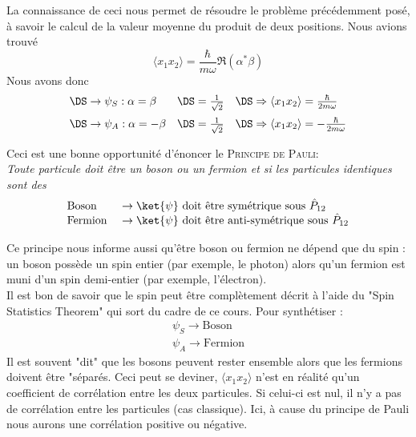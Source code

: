 La connaissance de ceci nous permet de résoudre le problème précédemment posé, à savoir le calcul 
de la valeur moyenne du produit de deux positions. Nous avions trouvé
\begin{equation}
\langle x_1x_2\rangle = \frac{\hbar}{m\omega}\Re(\alpha^*\beta)
\end{equation}
Nous avons donc
\begin{equation}
\begin{array}{lll}
\DS\to \psi_S : \alpha = \beta &\DS= \frac{1}{\sqrt{2}} &\DS\Rightarrow \langle x_1x_2\rangle = \frac{\hbar}{2m\omega}\vspace{2mm}\\
\DS\to \psi_A : \alpha = -\beta &\DS= \frac{1}{\sqrt{2}} &\DS\Rightarrow \langle x_1x_2\rangle = -\frac{\hbar}{2m\omega}
\end{array}
\end{equation}

Ceci est une bonne opportunité d'énoncer le \textsc{Principe de Pauli}:\\

\textit{Toute particule doit être un boson ou un fermion et si les particules identiques sont des }
 \begin{equation}
 \begin{array}{ll}
 \text{Boson } &\to \ket{\psi} \text{ doit être symétrique sous } \hat{P}_{12}\\
 \text{Fermion } &\to \ket{\psi} \text{ doit être anti-symétrique sous } \hat{P}_{12}
 \end{array}
 \end{equation}
 
 Ce principe nous informe aussi qu'être boson ou fermion ne dépend que du spin : un boson possède un 
 spin entier (par exemple, le photon) alors qu'un fermion est muni d'un spin demi-entier (par exemple, 
 l'électron).\\
 
 Il est bon de savoir que le spin peut être complètement décrit à l'aide du "Spin Statistics Theorem" qui 
 sort du cadre de ce cours. Pour synthétiser :
\begin{equation}
\begin{array}{ll}
\psi_S \to \text{Boson}\\
\psi_A \to \text{Fermion}
\end{array}
\end{equation}
Il est souvent "dit" que les bosons peuvent rester ensemble alors que les fermions doivent être "séparés. Ceci 
peut se deviner, $\langle x_1 x_2\rangle$ n'est en réalité qu'un coefficient de corrélation entre les deux 
particules. Si celui-ci est nul, il n'y a pas de corrélation entre les particules (cas classique). Ici, à cause 
du principe de Pauli nous aurons une corrélation positive ou négative.\\

